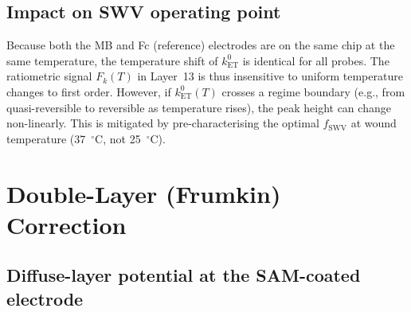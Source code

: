 \documentclass[10pt,a4paper]{article}
\numberwithin{equation}{section}
\newcommand{\kET}{k_{\text{ET}}^{0}}
\begin{document}
\subsection{Impact on SWV operating point}

Because both the MB and Fc (reference) electrodes are on the same chip
at the same temperature, the temperature shift of $\kET$ is identical
for all probes. The ratiometric signal $F_k(T)$ in Layer~13 is thus
insensitive to uniform temperature changes to first order. However,
if $\kET(T)$ crosses a regime boundary (e.g., from quasi-reversible
to reversible as temperature rises), the peak height can change
non-linearly. This is mitigated by pre-characterising the optimal
$f_{\text{SWV}}$ at wound temperature (37~$^\circ$C, not 25~$^\circ$C).

\section{Double-Layer (Frumkin) Correction}
\label{sec:frumkin}

\subsection{Diffuse-layer potential at the SAM-coated electrode}
\end{document}
